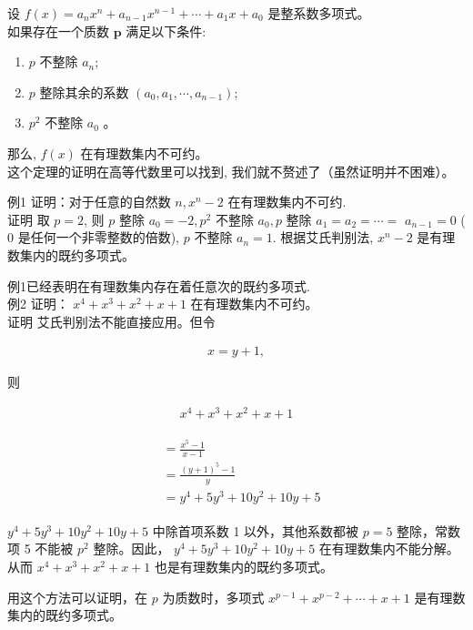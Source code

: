 \documentclass[10pt]{article}
\begin{document}
设 $f(x)=a_{n} x^{n}+a_{n-1} x^{n-1}+\cdots+a_{1} x+a_{0}$ 是整系数多项式。\\
如果存在一个质数 $\boldsymbol{p}$ 满足以下条件:

\begin{enumerate}
  \item $p$ 不整除 $a_{n}$;
  \item $p$ 整除其余的系数 $\left(a_{0}, a_{1}, \cdots, a_{n-1}\right)$;
  \item $p^{2}$ 不整除 $a_{0}$ 。
\end{enumerate}

那么, $f(x)$ 在有理数集内不可约。\\
这个定理的证明在高等代数里可以找到, 我们就不赘述了（虽然证明并不困难）。

例1 证明：对于任意的自然数 $n, x^{n}-2$ 在有理数集内不可约.\\
证明 取 $p=2$, 则 $p$ 整除 $a_{0}=-2, p^{2}$ 不整除 $a_{0}, p$ 整除 $a_{1}=a_{2}=\cdots=$ $a_{n-1}=0$ ( 0 是任何一个非零整数的倍数), $p$ 不整除 $a_{n}=1$. 根据艾氏判别法, $x^{n}-2$ 是有理数集内的既约多项式。

例1已经表明在有理数集内存在着任意次的既约多项式.\\
例2 证明： $x^{4}+x^{3}+x^{2}+x+1$ 在有理数集内不可约。\\
证明 艾氏判别法不能直接应用。但令

\begin{align*}
x=y+1,
\end{align*}

则

\begin{align*}
x^{4}+x^{3}+x^{2}+x+1
\end{align*}

\begin{align*}
\begin{aligned}
& =\frac{x^{5}-1}{x-1} \\
& =\frac{(y+1)^{5}-1}{y} \\
& =y^{4}+5 y^{3}+10 y^{2}+10 y+5
\end{aligned}
\end{align*}

$y^{4}+5 y^{3}+10 y^{2}+10 y+5$ 中除首项系数 1 以外，其他系数都被 $p=5$ 整除，常数项 5 不能被 $p^{2}$ 整除。因此， $y^{4}+5 y^{3}+10 y^{2}+10 y+5$ 在有理数集内不能分解。从而 $x^{4}+x^{3}+x^{2}+x+1$ 也是有理数集内的既约多项式。

用这个方法可以证明，在 $p$ 为质数时，多项式 $x^{p-1}+x^{p-2}+\cdots+x+1$ 是有理数集内的既约多项式。
\end{document}
